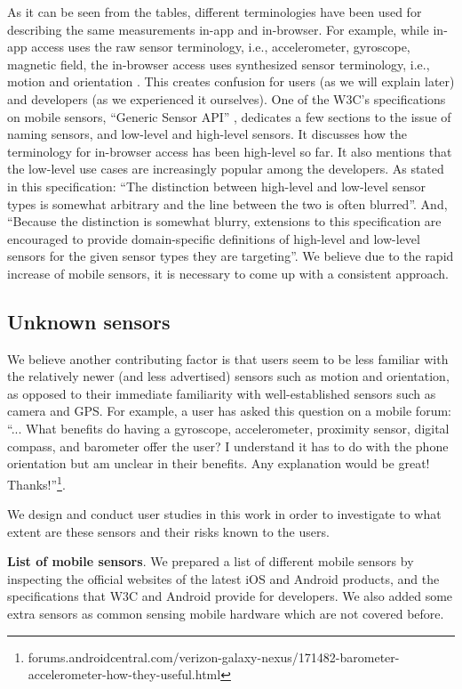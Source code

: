 \documentclass[10pt,twocolumn]{article}
\begin{document}
As it can be seen from the tables, different terminologies have been used for describing the same measurements in-app and in-browser. For example, while in-app access uses the raw sensor terminology, i.e., accelerometer, gyroscope, magnetic field, the in-browser access uses synthesized sensor terminology, i.e., motion and orientation \cite{W3CMotion}.
This creates confusion for users (as we will explain later) and developers (as we experienced it ourselves). One of the W3C's specifications on mobile sensors, ``Generic Sensor API'' \cite{Generic}, dedicates a few sections to the issue of naming sensors, and low-level and high-level sensors. It discusses how the terminology for in-browser access has been high-level so far. It also mentions that the low-level use cases are increasingly popular among the developers.      
As stated in this specification: ``The distinction between high-level and low-level sensor types is somewhat arbitrary and the line between the two is often blurred''. And, ``Because the distinction is somewhat blurry, extensions to this specification are encouraged to provide domain-specific definitions of high-level and low-level sensors for the given sensor types they are targeting''.
We believe due to the rapid increase of mobile sensors, it is necessary to come up with a consistent approach.


\subsection{Unknown sensors}
\label{sensorlist}
We believe another contributing factor is that users seem to be less familiar with the relatively newer (and less advertised) sensors such as motion and orientation, as opposed to their immediate familiarity with well-established sensors such as camera and GPS. 
For example, a user has asked this question on a mobile forum: ``... What benefits do having a gyroscope, accelerometer, proximity sensor, digital compass, and barometer offer the user? I understand it has to do with the phone orientation but am unclear in their benefits. Any explanation would be great! Thanks!''\footnote{forums.androidcentral.com/verizon-galaxy-nexus/171482-barometer-accelerometer-how-they-useful.html}.

We design and conduct user studies in this work in order to investigate to what extent are these sensors and their risks known to the users. 

\textbf{List of mobile sensors}.
We prepared a list of different mobile sensors by inspecting the official websites of the latest iOS and Android products, and the specifications that W3C and Android provide for developers. We also added some extra sensors as common sensing mobile hardware which are not covered before.
\end{document}
